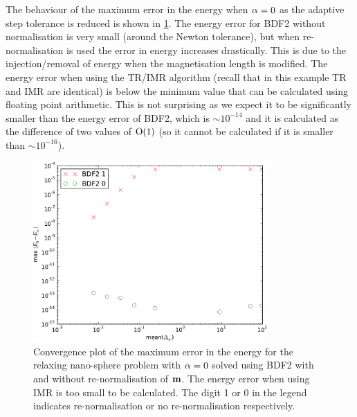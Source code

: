 The behaviour of the maximum error in the energy when $\alpha = 0$ as the adaptive step tolerance is reduced is shown in \cref{fig:energy-aimr-ode}.
The energy error for BDF2 without normalisation is very small (around the Newton tolerance), but when re-normalisation is used the error in energy increases drastically.
This is due to the injection/removal of energy when the magnetisation length is modified.
The energy error when using the TR/IMR algorithm (recall that in this example TR and IMR are identical) is below the minimum value that can be calculated using floating point arithmetic.
This is not surprising as we expect it to be significantly smaller than the energy error of BDF2, which is $\sim 10^{-14}$ and it is calculated as the difference of two values of $\mathrm{O}{\left( 1 \right)}$ (so it cannot be calculated if it is smaller than $\sim 10^{-16}$).


\begin{figure}
  \centering
  \includegraphics[width=0.8\textwidth]{plots/ode_llg_adaptive_energy/maxabsofenergychangevsmeanofdts}
  \caption{Convergence plot of the maximum error in the energy for the relaxing nano-sphere problem with $\alpha = 0$ solved using BDF2 with and without re-normalisation of $\boldsymbol{\mathrm{m}}$.
The energy error when using IMR is too small to be calculated.
The digit 1 or 0 in the legend indicates re-normalisation or no re-normalisation respectively.
}
  \label{fig:energy-aimr-ode}
\end{figure}

